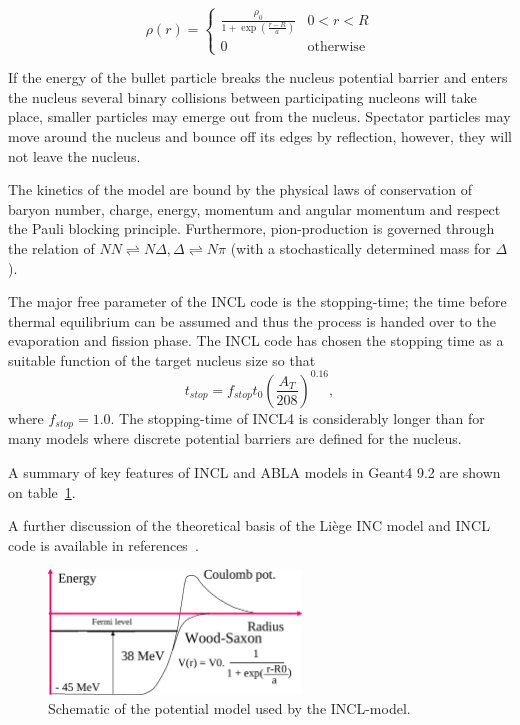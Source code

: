 \begin{equation}
\rho(r) = \begin{cases}
\frac{\rho_{0}}{1+\exp({\frac{r-R}{a}})} & 0 < r < R \\
0 & \text{otherwise}
\end{cases}
\label{WoodsSaxonINCL}
\end{equation}

If the energy of the bullet particle breaks the nucleus potential barrier and enters the nucleus several binary collisions between participating nucleons will take place, smaller particles may emerge out from the nucleus. Spectator particles may move around the nucleus and bounce off its edges by reflection, however, they will not leave the nucleus.

The kinetics of the model are bound by the physical laws of conservation of baryon number, charge, energy, momentum and angular momentum and respect the Pauli blocking principle. Furthermore, pion-production is governed through the relation of $NN \rightleftharpoons N \Delta, \Delta \rightleftharpoons N\pi$ (with a stochastically determined mass for $\Delta$).

The major free parameter of the INCL code is the stopping-time; the time before thermal equilibrium can be assumed and thus the process is handed over to the evaporation and fission phase. The INCL code has chosen the stopping time as a suitable function of the target nucleus size so that \begin{equation}t_{stop} = f_{stop}t_{0}(\frac{A_T}{208})^{0.16},\end{equation} where $f_{stop} = 1.0$. The stopping-time of INCL4 is considerably longer than for many models where discrete potential barriers are defined for the nucleus.

A summary of key features of INCL and ABLA models in Geant4 9.2 are shown on table~\ref{fig:inclpotential}.

A further discussion of the theoretical basis of the Liège INC model and INCL code is available in references~\cite{PhysRevC.66.044615,iia,incl42cascadeandabla}.

\begin{figure}[ht]
\begin{center}
\includegraphics[width=0.6\textwidth]{images/inclPotential.png}  
\caption{\label{fig:inclpotential} Schematic of the potential model used by the INCL-model.}
\end{center}
\end{figure}

